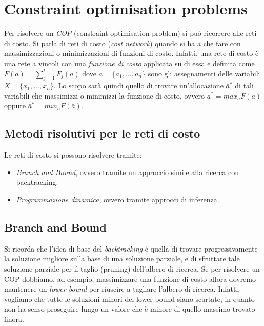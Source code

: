 \documentclass[11pt,oneside]{book}
\begin{document}
\section{Constraint optimisation problems}
Per risolvere un \textit{COP} (constraint optimisation problem) si può ricorrere alle reti di costo. Si parla di reti di costo (\textit{cost network}) quando si ha a che fare con massimizzazioni o minimizzazioni di funzioni di costo. Infatti, una rete di costo è una rete a vincoli con una \textit{funzione di costo} applicata su di essa e definita come $F(\bar{a}) = \sum_{j=1}^l F_j(\bar{a})$ dove $\bar{a} = \{ a_1, ..., a_n \}$ sono gli assegnamenti delle variabili $X = \{ x_1, ..., x_n \}$. Lo scopo sarà quindi quello di trovare un'allocazione $\bar{a}^\ast$ di tali variabili che massimizzi o minimizzi la funzione di costo, ovvero $\bar{a}^\ast= max_{\bar{a}} F(\bar{a})$ oppure $\bar{a}^\ast = min_{\bar{a}} F(\bar{a})$.

\subsection{Metodi risolutivi per le reti di costo}
Le reti di costo si possono risolvere tramite:
\begin{itemize}
	\item \textit{Branch and Bound}, ovvero tramite un approccio simile alla ricerca con backtracking.
	\item \textit{Programmazione dinamica}, ovvero tramite approcci di inferenza.
\end{itemize}

\subsection{Branch and Bound}
Si ricorda che l'idea di base del \textit{backtracking} è quella di trovare progressivamente la soluzione migliore sulla base di una soluzione parziale, e di sfruttare tale soluzione parziale per il taglio (pruning) dell'albero di ricerca. Se per risolvere un COP dobbiamo, ad esempio, massimizzare una funzione di costo allora dovremo mantenere un \textit{lower bound} per riuscire a tagliare l'albero di ricerca. Infatti, vogliamo che tutte le soluzioni minori del lower bound siano scartate, in quanto non ha senso proseguire lungo un valore che è minore di quello massimo trovato finora.
\end{document}
